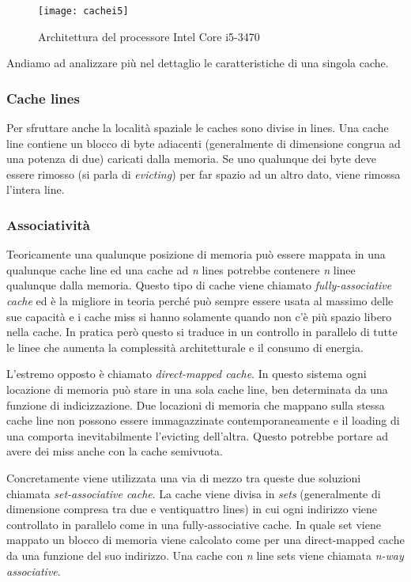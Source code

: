 			\begin{figure}
				\begin{center}
					\texttt{[image: cachei5]}
					\caption{Architettura del processore Intel Core i5-3470}
					\label{fig:cachei5}
				\end{center}
			\end{figure}
			
			Andiamo ad analizzare più nel dettaglio le caratteristiche di una singola cache\cite{ge2016survey,yarom2014flush+}.
			
			\subsubsection{Cache lines}
				Per sfruttare anche la località spaziale le caches sono divise in lines. Una cache line contiene un blocco di byte adiacenti (generalmente di dimensione congrua ad una potenza di due) caricati dalla memoria. Se uno qualunque dei byte deve essere rimosso (si parla di \emph{evicting}) per far spazio ad un altro dato, viene rimossa l'intera line.
				
			\subsubsection{Associatività}
				Teoricamente una qualunque posizione di memoria può essere mappata in una qualunque cache line ed una cache ad \emph{n} lines potrebbe contenere \emph{n} linee qualunque dalla memoria. Questo tipo di cache viene chiamato \emph{fully-associative cache} ed è la migliore in teoria perché può sempre essere usata al massimo delle sue capacità e i cache miss si hanno solamente quando non c'è più spazio libero nella cache. In pratica però questo si traduce in un controllo in parallelo di tutte le linee che aumenta la complessità architetturale e il consumo di energia.
				
				L'estremo opposto è chiamato \emph{direct-mapped cache}. In questo sistema ogni locazione di memoria può stare in una sola cache line, ben determinata da una funzione di indicizzazione. Due locazioni di memoria che mappano sulla stessa cache line non possono essere immagazzinate contemporaneamente e il loading di una comporta inevitabilmente l'evicting dell'altra. Questo potrebbe portare ad avere dei miss anche con la cache semivuota.
				
				Concretamente viene utilizzata una via di mezzo tra queste due soluzioni chiamata \emph{set-associative cache}. La cache viene divisa in \emph{sets} (generalmente di dimensione compresa tra due e ventiquattro lines) in cui ogni indirizzo viene controllato in parallelo come in una fully-associative cache. In quale set viene mappato un blocco di memoria viene calcolato come per una direct-mapped cache da una funzione del suo indirizzo. Una cache con \emph{n} line sets viene chiamata \emph{n-way associative}. 
				
